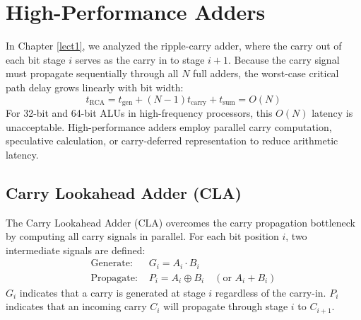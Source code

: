 \section{High-Performance Adders} \label{sec:high_performance_adders}

In Chapter \ref{lect1}, we analyzed the ripple-carry adder, where the carry out of each bit stage $i$ serves as the carry in to stage $i+1$. Because the carry signal must propagate sequentially through all $N$ full adders, the worst-case critical path delay grows linearly with bit width:
\begin{equation}
t_{\text{RCA}} = t_{\text{gen}} + (N - 1) t_{\text{carry}} + t_{\text{sum}} = O(N)
\end{equation}
For 32-bit and 64-bit ALUs in high-frequency processors, this $O(N)$ latency is unacceptable. High-performance adders employ parallel carry computation, speculative calculation, or carry-deferred representation to reduce arithmetic latency.

\subsection{Carry Lookahead Adder (CLA)}
The Carry Lookahead Adder (CLA) overcomes the carry propagation bottleneck by computing all carry signals in parallel. For each bit position $i$, two intermediate signals are defined:
\begin{align}
\text{Generate: } & G_i = A_i \cdot B_i \\
\text{Propagate: } & P_i = A_i \oplus B_i \quad (\text{or } A_i + B_i)
\end{align}
$G_i$ indicates that a carry is generated at stage $i$ regardless of the carry-in. $P_i$ indicates that an incoming carry $C_i$ will propagate through stage $i$ to $C_{i+1}$.

